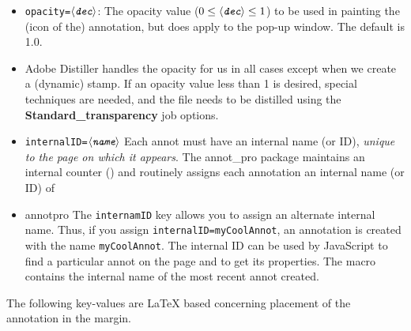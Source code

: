 \documentclass[12pt]{article}
\makeatletter
\def\pkg{\textsf}
\let\opt\texttt
\def\ameta#1{$\langle\textit{\texttt{#1}}\rangle$}
\renewenvironment{quote}[1][]
   {\def\@rgi{#1}\ifx\@rgi\@empty
    \let\rghtm\@empty\else\def\rghtm{\rightmargin\leftmargin}\fi
    \list{}{\rghtm} %
    \item\relax}
   {\endlist}
\makeatother
\begin{document}
\begin{itemize}
  \item \texttt{opacity=\ameta{dec}}: The opacity value ($
          \text0\le\text{\ameta{dec}}\le\text1$) to be used in painting the (icon of
          the) annotation, but does apply to the pop-up window. The default
          is 1.0.
  \item[] Adobe Distiller handles the opacity for us in all cases except when we create a (dynamic) stamp.
        If an opacity value less than 1 is desired, special techniques are needed, and the file needs to
        be distilled using the \textbf{Standard\_transparency} job options.
  \item \texttt{internalID=\ameta{name}} Each annot must have an internal
      name (or ID), \emph{unique to the page on which it appears}. The
      \pkg{annot\_pro} package maintains an internal counter
      () and routinely assigns each annotation an internal
      name (or ID) of
      \begin{quote}\ttfamily
        annotpro\string\the\string\ap@annot@cnt
      \end{quote}
      The \opt{internamID} key allows you to assign an alternate internal
      name. Thus, if you assign \texttt{internalID=myCoolAnnot}, an
      annotation is created with the name \texttt{myCoolAnnot}. The
      internal ID can be used by JavaScript to find a particular annot on
      the page and to get its properties. The macro 
      contains the internal name of the most recent annot created.
\end{itemize}
The following key-values are {\LaTeX} based concerning placement of the
annotation in the margin.
\end{document}
